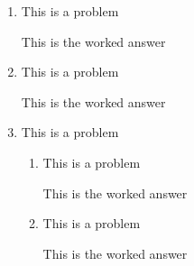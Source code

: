 \documentclass[letter,12pt]{article}
\begin{document}
\printsolution %

\assignmentinfo

\begin{enumerate}
\item This is a problem
  \begin{solution}
    This is the worked answer
  \end{solution}
  \vfill
  
\item This is a problem
  \begin{solution}
    This is the worked answer
  \end{solution}
  \vfill
  
  \newpage
  
\item This is a problem
  \begin{enumerate}
  \item This is a problem
    \begin{solution}
      This is the worked answer
    \end{solution}
    \vfill
    
  \item This is a problem
    \begin{solution}
      This is the worked answer
    \end{solution}
    \vfill
    
  \end{enumerate}
\end{enumerate}
\end{document}

